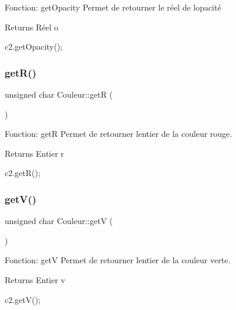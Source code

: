 Fonction\+: get\+Opacity Permet de retourner le réel de l\textquotesingle{}opacité 

\begin{DoxyReturn}{Returns}
Réel o 
\begin{DoxyCode}
c2.getOpacity();
\end{DoxyCode}
 
\end{DoxyReturn}
\mbox{\label{classCouleur_aa3d10f39d94ed884dda69a2420cd3357}} 
\subsubsection{\texorpdfstring{get\+R()}{getR()}}
{\footnotesize\ttfamily unsigned char Couleur\+::getR (\begin{DoxyParamCaption}{ }\end{DoxyParamCaption})}



Fonction\+: getR Permet de retourner l\textquotesingle{}entier de la couleur rouge. 

\begin{DoxyReturn}{Returns}
Entier r 
\begin{DoxyCode}
c2.getR();
\end{DoxyCode}
 
\end{DoxyReturn}
\mbox{\label{classCouleur_a15c9bd61ea816ad1fb9a7e13806142c7}} 
\subsubsection{\texorpdfstring{get\+V()}{getV()}}
{\footnotesize\ttfamily unsigned char Couleur\+::getV (\begin{DoxyParamCaption}{ }\end{DoxyParamCaption})}



Fonction\+: getV Permet de retourner l\textquotesingle{}entier de la couleur verte. 

\begin{DoxyReturn}{Returns}
Entier v 
\begin{DoxyCode}
c2.getV();
\end{DoxyCode}
 
\end{DoxyReturn}
\mbox{\label{classCouleur_a939297e6a11ff80510d6acf02bfa3ac0}} 
